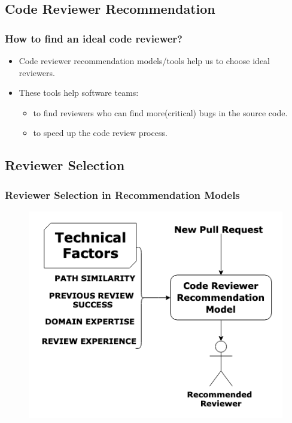 \documentclass{beamer}
\begin{document}
\subsection{Code Reviewer Recommendation}

\begin{frame}
\frametitle{How to find an ideal code reviewer?}

    \begin{itemize}
    \item Code reviewer recommendation models/tools help us to choose ideal reviewers.
    \item These tools help software teams:
        \begin{itemize}
            \item to find reviewers who can find more(critical) bugs in the source code.
            \item to speed up the code review process.
        \end{itemize}
  \end{itemize}


\end{frame}




\subsection{Reviewer Selection}

\begin{frame}
\frametitle{\large Reviewer Selection in Recommendation Models }

  \begin{figure}
    \includegraphics[scale=0.5]{img/algos.png}
    \end{figure}

\end{frame}
\end{document}
